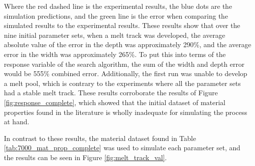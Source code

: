 \documentclass[metals,article,accept,pdftex,moreauthors]{Definitions/mdpi}
\begin{document}
Where the red dashed line is the experimental results, the blue dots are the simulation 
predictions, and the green line is the error when comparing the simulated results to the 
experimental results.
These results show that over the nine initial parameter sets, when a melt track was 
developed, the average absolute value of the error in the depth was approximately 290\%, 
and the average error in the width was approximately 265\%.  To put this into terms of the 
response variable of the search algorithm, the sum of the width and depth error would be 
555\% combined error.
Additionally, the first run was unable to develop a melt pool, which is contrary to the 
experiments where all the parameter sets had a stable melt track.  These results 
corroborate the results of Figure \ref{fig:response_complete}, which showed that the 
 initial dataset of material properties 
found in the literature is wholly inadequate for simulating the process at hand.  %


In contrast to these results, the material dataset found in Table 
\ref{tab:7000_mat_prop_complete} was used to simulate each parameter set, and the 
results can be seen in Figure \ref{fig:melt_track_val}.
\end{document}
